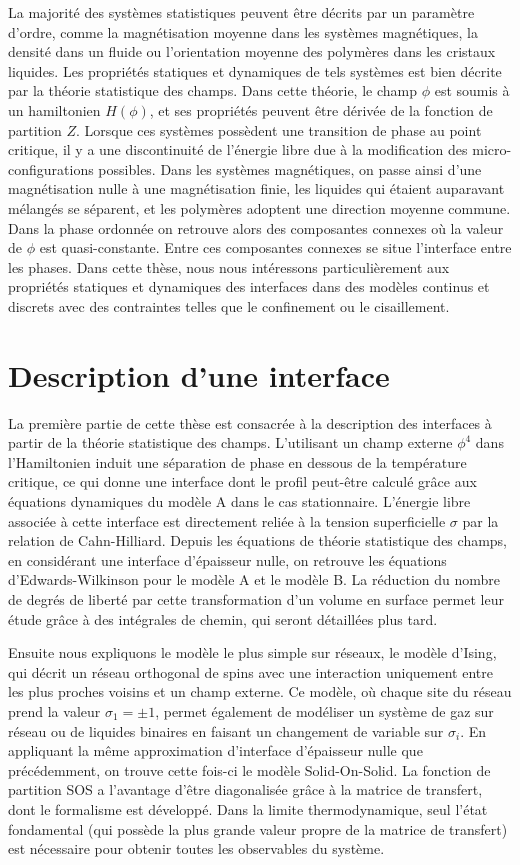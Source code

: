 La majorité des systèmes statistiques peuvent être décrits par un paramètre d'ordre, comme la magnétisation moyenne dans les systèmes magnétiques, la densité dans un fluide ou l'orientation moyenne des polymères dans les cristaux liquides. Les propriétés statiques et dynamiques de tels systèmes est bien décrite par la théorie statistique des champs. Dans cette théorie, le champ $\phi$ est soumis à un hamiltonien $H(\phi)$, et ses propriétés peuvent être dérivée de la fonction de partition $Z$.
Lorsque ces systèmes possèdent une transition de phase au point critique, il y a une discontinuité de l'énergie libre due à la modification des micro-configurations possibles. 
Dans les systèmes magnétiques, on passe ainsi d'une magnétisation nulle à une magnétisation finie, les liquides qui étaient auparavant mélangés se séparent, et les polymères adoptent une direction moyenne commune. Dans la phase ordonnée on retrouve alors des composantes connexes où la valeur de $\phi$ est quasi-constante. Entre ces composantes connexes se situe l'interface entre les phases. 
Dans cette thèse, nous nous intéressons particulièrement aux propriétés statiques et dynamiques des interfaces dans des modèles continus et discrets avec des contraintes telles que le confinement ou le cisaillement. 

\section*{Description d'une interface} 

La première partie de cette thèse est consacrée à la description des interfaces à partir de la théorie statistique des champs. L'utilisant un champ externe $\phi^4$ dans l'Hamiltonien induit une séparation de phase en dessous de la température critique, ce qui donne une interface dont le profil peut-être calculé grâce aux équations dynamiques du modèle A dans le cas stationnaire. L'énergie libre associée à cette interface est directement reliée à la tension superficielle $\sigma$ par la relation de Cahn-Hilliard.
Depuis les équations de théorie statistique des champs, en considérant une interface d'épaisseur nulle, on retrouve les équations d'Edwards-Wilkinson pour le modèle A et le modèle B. La réduction du nombre de degrés de liberté par cette transformation d'un volume en surface permet leur étude grâce à des intégrales de chemin, qui seront détaillées plus tard.

Ensuite nous expliquons le modèle le plus simple sur réseaux, le modèle d'Ising, qui décrit un réseau orthogonal de spins avec une interaction uniquement entre les plus proches voisins et un champ externe. Ce modèle, où chaque site du réseau prend la valeur $\sigma_1 = \pm1$, permet également de modéliser un système de gaz sur réseau ou de liquides binaires en faisant un changement de variable sur $\sigma_i$. En appliquant la même approximation d'interface d'épaisseur nulle que précédemment, on trouve cette fois-ci le modèle Solid-On-Solid. La fonction de partition SOS a l'avantage d'être diagonalisée grâce à la matrice de transfert, dont le formalisme est développé. Dans la limite thermodynamique, seul l'état fondamental (qui possède la plus grande valeur propre de la matrice de transfert) est nécessaire pour obtenir toutes les observables du système. 

